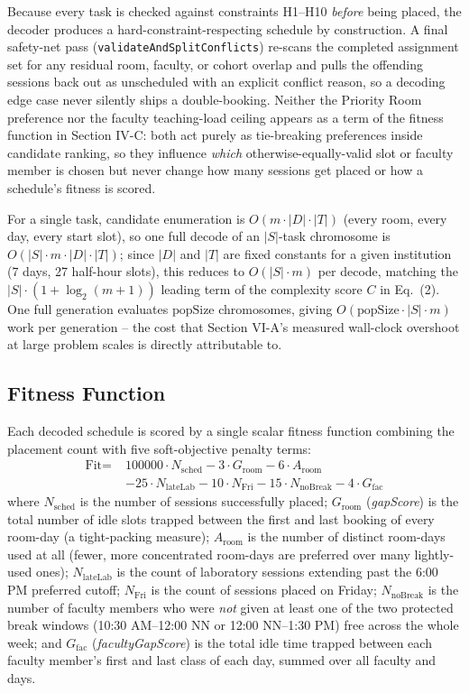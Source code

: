 \documentclass[conference]{IEEEtran}
\begin{document}
Because every task is checked against constraints H1--H10 \emph{before} being placed, the decoder produces a hard-constraint-respecting schedule by construction. A final safety-net pass (\texttt{validateAndSplitConflicts}) re-scans the completed assignment set for any residual room, faculty, or cohort overlap and pulls the offending sessions back out as unscheduled with an explicit conflict reason, so a decoding edge case never silently ships a double-booking. Neither the Priority Room preference nor the faculty teaching-load ceiling appears as a term of the fitness function in Section IV-C: both act purely as tie-breaking preferences inside candidate ranking, so they influence \emph{which} otherwise-equally-valid slot or faculty member is chosen but never change how many sessions get placed or how a schedule's fitness is scored.

For a single task, candidate enumeration is $O(m \cdot |D| \cdot |T|)$ (every room, every day, every start slot), so one full decode of an $|S|$-task chromosome is $O(|S| \cdot m \cdot |D| \cdot |T|)$; since $|D|$ and $|T|$ are fixed constants for a given institution (7 days, 27 half-hour slots), this reduces to $O(|S| \cdot m)$ per decode, matching the $|S| \cdot (1+\log_2(m{+}1))$ leading term of the complexity score $C$ in Eq.~(2). One full generation evaluates $\text{popSize}$ chromosomes, giving $O(\text{popSize} \cdot |S| \cdot m)$ work per generation -- the cost that Section VI-A's measured wall-clock overshoot at large problem scales is directly attributable to.

\subsection{Fitness Function}
Each decoded schedule is scored by a single scalar fitness function combining the placement count with five soft-objective penalty terms:
\begin{equation}
\begin{aligned}
\text{Fit} = \; & 100000 \cdot N_{\text{sched}} - 3 \cdot G_{\text{room}} - 6 \cdot A_{\text{room}} \\
& - 25 \cdot N_{\text{lateLab}} - 10 \cdot N_{\text{Fri}} - 15 \cdot N_{\text{noBreak}} - 4 \cdot G_{\text{fac}}
\end{aligned}
\label{eq:fitness}
\end{equation}
where $N_{\text{sched}}$ is the number of sessions successfully placed; $G_{\text{room}}$ (\emph{gapScore}) is the total number of idle slots trapped between the first and last booking of every room-day (a tight-packing measure); $A_{\text{room}}$ is the number of distinct room-days used at all (fewer, more concentrated room-days are preferred over many lightly-used ones); $N_{\text{lateLab}}$ is the count of laboratory sessions extending past the 6:00 PM preferred cutoff; $N_{\text{Fri}}$ is the count of sessions placed on Friday; $N_{\text{noBreak}}$ is the number of faculty members who were \emph{not} given at least one of the two protected break windows (10:30 AM--12:00 NN or 12:00 NN--1:30 PM) free across the whole week; and $G_{\text{fac}}$ (\emph{facultyGapScore}) is the total idle time trapped between each faculty member's first and last class of each day, summed over all faculty and days.
\end{document}
